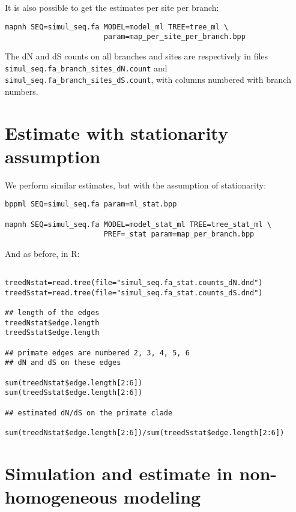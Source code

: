\documentclass[11pt, a4paper]{article}
\begin{document}
It is also possible to get the estimates per site per branch:

\begin{verbatim}
mapnh SEQ=simul_seq.fa MODEL=model_ml TREE=tree_ml \
                       param=map_per_site_per_branch.bpp
\end{verbatim}

The dN and dS counts on all branches and sites are respectively in
files \verb|simul_seq.fa_branch_sites_dN.count| and\\
\verb|simul_seq.fa_branch_sites_dS.count|, with columns numbered
with branch numbers.


\section*{Estimate with stationarity assumption}

We perform similar estimates, but with the assumption of
stationarity:

\begin{verbatim}
bppml SEQ=simul_seq.fa param=ml_stat.bpp

mapnh SEQ=simul_seq.fa MODEL=model_stat_ml TREE=tree_stat_ml \
                       PREF=_stat param=map_per_branch.bpp

\end{verbatim}

And as before, in R:

\begin{verbatim}

treedNstat=read.tree(file="simul_seq.fa_stat.counts_dN.dnd")  
treedSstat=read.tree(file="simul_seq.fa_stat.counts_dS.dnd")  

## length of the edges 
treedNstat$edge.length
treedSstat$edge.length

## primate edges are numbered 2, 3, 4, 5, 6
## dN and dS on these edges

sum(treedNstat$edge.length[2:6])
sum(treedSstat$edge.length[2:6])

## estimated dN/dS on the primate clade

sum(treedNstat$edge.length[2:6])/sum(treedSstat$edge.length[2:6])

\end{verbatim}


\section*{Simulation and estimate in non-homogeneous modeling}
\end{document}
